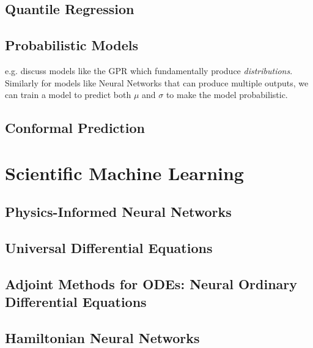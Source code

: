 \subsection{Quantile Regression}
\subsection{Probabilistic Models}
e.g. discuss models like the GPR which fundamentally produce \textit{distributions}. Similarly for models like Neural Networks that can produce multiple outputs, we can train a model to predict both $\mu$ and $\sigma$ to make the model probabilistic.

\subsection{Conformal Prediction}




\section{Scientific Machine Learning}
\subsection{Physics-Informed Neural Networks}
\subsection{Universal Differential Equations}
\subsection{Adjoint Methods for ODEs: Neural Ordinary Differential Equations}
\subsection{Hamiltonian Neural Networks}






